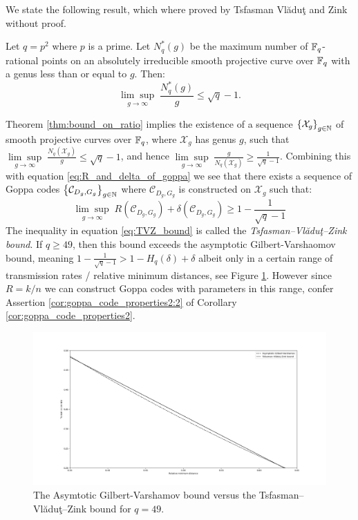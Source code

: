 We state the following result, which where proved by Tsfasman Vlăduţ and Zink without proof.
\begin{theorem}\label{thm:bound_on_ratio}
  Let $q = p^{2}$ where $p$ is a prime. Let $N_{q}^{*}(g)$ be the maximum number of $\mathbb{F}_{q}$-rational points on an absolutely irreducible smooth projective curve over $\mathbb{F}_{q}$ with a genus less than or equal to $g$. Then:
  \begin{equation*}
    \underset{g \to \infty}{\lim \sup}\;\frac{N_{q}^{*}(g)}{g} \leq \sqrt{q} - 1.
  \end{equation*}
\end{theorem}
Theorem \ref{thm:bound_on_ratio} implies the existence of a sequence $\left\{\mathcal{X}_{g}\right\}_{g \in \mathbb{N}}$ of smooth projective curves over $\mathbb{F}_{q}$, where $\mathcal{X}_g$ has genus $g$, such that $\underset{g \to \infty}{\lim \sup}\; \frac{N_{q}(\mathcal{X}_{g})}{g} \leq \sqrt{q} - 1$, and hence $\underset{g \to \infty}{\lim \sup}\; \frac{g}{N_{q}(\mathcal{X}_{g})} \geq \frac{1}{\sqrt{q} - 1}$. Combining this with equation \eqref{eq:R_and_delta_of_goppa} we see that there exists a sequence of Goppa codes $\left\{\mathcal{C}_{D_{g}, G_{g}}\right\}_{g \in \mathbb{N}}$ where $\mathcal{C}_{D_g, G_g}$ is constructed on $\mathcal{X}_g$ such that:
\begin{equation}\label{eq:TVZ_bound}
  \underset{g \to \infty}{\lim \sup} \; R(\mathcal{C}_{D_g, G_g}) + \delta(\mathcal{C}_{D_g, G_g}) \geq 1 - \frac{1}{\sqrt{q} - 1}
\end{equation}
The inequality in equation \eqref{eq:TVZ_bound} is called the \textit{Tsfasman–Vlăduţ–Zink bound}. If $q \geq 49$, then this bound exceeds the asymptotic Gilbert-Varshaomov bound, meaning $1 - \frac{1}{\sqrt{q} - 1} > 1 - H_{q}(\delta) + \delta$ albeit only in a certain range of transmission rates / relative minimum distances, see Figure \ref{fig:tvz}.
However since $R = k / n$ we can construct Goppa codes with parameters in this range, confer Assertion \ref{cor:goppa_code_properties2:2} of Corollary \ref{cor:goppa_code_properties2}.
\begin{figure}[H]
    \centering
    \includegraphics[trim={3cm 1cm 3cm 2cm},clip, scale=0.35]{tvz.png}
    \caption{The Asymtotic Gilbert-Varshamov bound versus the Tsfasman–Vlăduţ–Zink bound for $q = 49$.}
    \label{fig:tvz}
\end{figure}
